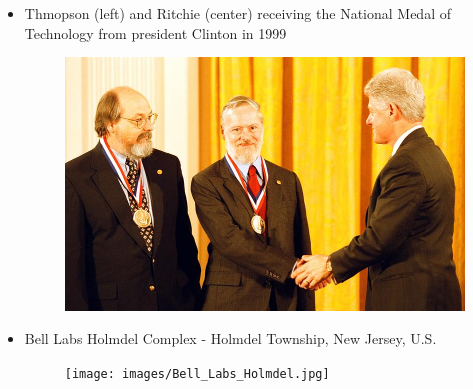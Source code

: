 \documentclass[12pt]{article}
\begin{document}
\begin{itemize}
    \item Thmopson (left) and Ritchie (center) receiving the National Medal of Technology from president Clinton in 1999
    \begin{figure}[H]
        \centering
        \captionsetup{labelformat=empty}
        \includegraphics[width=420px]{images/Ken-Thompson-Dennis-Ritchie-and-Bill-Clinton.jpg}
        \label{fig:enter-label}
    \end{figure}

    \item Bell Labs Holmdel Complex - Holmdel Township, New Jersey, U.S.
    \begin{figure}[H]
        \centering
        \captionsetup{labelformat=empty}
        \texttt{[image: images/Bell\_Labs\_Holmdel.jpg]}
        \label{fig:enter-label}
    \end{figure}
\end{itemize}
\end{document}
